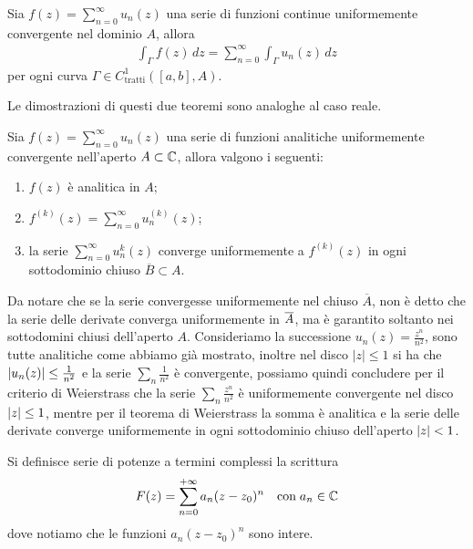 \begin{theorem}
  Sia $ f(z) = \sum_{n = 0}^\infty u_n(z) $ una serie di funzioni continue uniformemente convergente nel dominio $ A $, allora 
  \begin{align}
    \int_\Gamma f(z) \,dz = \sum_{n = 0}^\infty \int_\Gamma u_n(z) \,dz
  \end{align}
  per ogni curva $ \Gamma \in C^1_{\text{tratti}}([a,b], A) $.
\end{theorem}
Le dimostrazioni di questi due teoremi sono analoghe al caso reale.
\begin{theorem}[ di Weierstrass ]
  Sia $ f(z) = \sum_{n = 0}^\infty u_n(z) $ una serie di funzioni analitiche uniformemente convergente nell'aperto $ A \subset \mathbb{C} $, allora valgono i seguenti:
  \begin{enumerate}
    \item $ f(z) $ è analitica in $ A $;
    \item $ f^{(k)}(z) = \sum_{n = 0}^\infty u_n^{(k)}(z) $;
    \item la serie $ \sum_{n = 0}^\infty u_n^{k}(z) $ converge uniformemente a $ f^{(k)}(z) $ in ogni sottodominio chiuso $ \overline{B} \subset A $.
  \end{enumerate}
\end{theorem}
Da notare che se la serie convergesse uniformemente nel chiuso $ \overline{A} $, non è detto che la serie delle derivate converga uniformemente in 
$ \overline{A} $, ma è garantito soltanto nei sottodomini chiusi dell'aperto $ A $. Consideriamo la successione $ u_n(z) = \frac{z^n}{n^2} $, sono tutte 
analitiche come abbiamo già mostrato, inoltre nel disco $ |z| \leq 1 $ si ha che $ \left|{u_n(z)}\right| \leq \frac{1}{n^2} $ e la serie $ \sum_n \frac1{n^2} $ 
è convergente, possiamo quindi concludere per il criterio di Weierstrass che la serie $ \sum_n \frac{z^n}{n^2} $ è uniformemente convergente nel disco 
$ \left|{z}\right| \leq 1 $, mentre per il teorema di Weierstrass la somma è analitica e la serie delle derivate converge uniformemente in ogni sottodominio 
chiuso dell'aperto $ \left|{z}\right| < 1 $.

\begin{definition}
  Si definisce serie di potenze a termini complessi la scrittura 
  \begin{align}
    F(z) = \sum_{n = 0}^{+\infty} a_n (z - z_0)^n \quad \textnormal{con} \; a_n \in \mathbb{C}
  \end{align}
  dove notiamo che le funzioni $ a_n (z - z_0)^n $ sono intere.
\end{definition}

